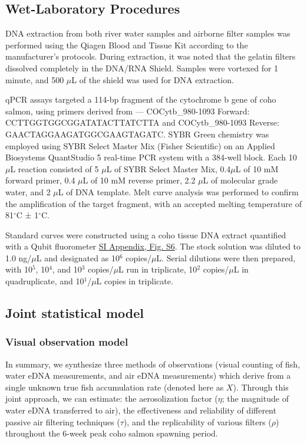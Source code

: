 \documentclass{article}
\begin{document}
\subsection{Wet-Laboratory Procedures}
DNA extraction from both river water samples and airborne filter samples was performed using the Qiagen Blood and Tissue Kit according to the manufacturer’s protocols. During extraction, it was noted that the gelatin filters dissolved completely in the DNA/RNA Shield. Samples were vortexed for 1 minute, and 500 $\mu$L of the shield was used for DNA extraction.

qPCR assays targeted a 114-bp fragment of the cytochrome b gene of coho salmon, using primers derived from \cite{duda2021}— COCytb\_980-1093 Forward: CCTTGGTGGCGGATATACTTATCTTA and COCytb\_980-1093 Reverse: GAACTAGGAAGATGGCGAAGTAGATC. SYBR Green chemistry was employed using SYBR Select Master Mix (Fisher Scientific) on an Applied Biosystems QuantStudio 5 real-time PCR system with a 384-well block. Each 10 $\mu$L reaction consisted of 5 $\mu$L of SYBR Select Master Mix, 0.4$\mu$L of 10 mM forward primer, 0.4 $\mu$L of 10 mM reverse primer, 2.2 $\mu$L of molecular grade water, and 2 $\mu$L of DNA template. Melt curve analysis was performed to confirm the amplification of the target fragment, with an accepted melting temperature of 81$^\circ$C ± 1$^\circ$C.

Standard curves were constructed using a coho tissue DNA extract quantified with a Qubit fluorometer \href{SI_Appendix.pdf}{SI Appendix, Fig. S6}. The stock solution was diluted to 1.0 ng/$\mu$L and designated as 10$^6$ copies/$\mu$L. Serial dilutions were then prepared, with 10$^5$, 10$^4$, and 10$^3$ copies/$\mu$L run in triplicate, 10$^2$ copies/$\mu$L in quadruplicate, and 10$^1$/$\mu$L copies in triplicate.


\subsection{Joint statistical model}
\subsubsection{Visual observation model}
In summary, we synthesize three methods of observations (visual counting of fish, water eDNA measurements, and air eDNA measurements) which derive from a single unknown true fish accumulation rate (denoted here as $X$). Through this joint approach, we can estimate: the aerosolization factor ($\eta$; the magnitude of water eDNA transferred to air), the effectiveness and reliability of different passive air filtering techniques ($\tau$), and the replicability of various filters ($\rho$) throughout the 6-week peak coho salmon spawning period.
\end{document}
